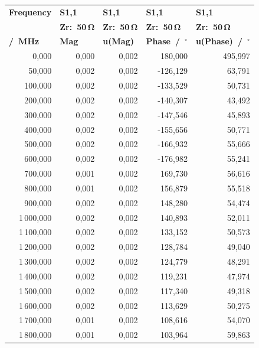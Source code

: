\begin{longtable}{rrrrr}
\multicolumn{1}{l}{\textbf{Frequency}} & \multicolumn{1}{l}{\textbf{S1,1}} & \multicolumn{1}{l}{\textbf{S1,1}} & \multicolumn{1}{l}{\textbf{S1,1}} & \multicolumn{1}{l}{\textbf{S1,1}}\\
\multicolumn{1}{l}{\textbf{}} & \multicolumn{1}{l}{\textbf{Zr:~50\,$\mathbf{\Omega}$}} & \multicolumn{1}{l}{\textbf{Zr:~50\,$\mathbf{\Omega}$}} & \multicolumn{1}{l}{\textbf{Zr:~50\,$\mathbf{\Omega}$}} & \multicolumn{1}{l}{\textbf{Zr:~50\,$\mathbf{\Omega}$}}\\
\multicolumn{1}{l}{\textbf{/~MHz}} & \multicolumn{1}{l}{\textbf{Mag}} & \multicolumn{1}{l}{\textbf{u(Mag)}} & \multicolumn{1}{l}{\textbf{Phase~/~$\mathbf{^{\circ}}$}} & \multicolumn{1}{l}{\textbf{u(Phase)~/~$\mathbf{^{\circ}}$}}\\
\hline
\endhead
0,000 & 0,000 & 0,002 & 180,000 & 495,997\\
50,000 & 0,002 & 0,002 & -126,129 & 63,791\\
100,000 & 0,002 & 0,002 & -133,529 & 50,731\\
200,000 & 0,002 & 0,002 & -140,307 & 43,492\\
300,000 & 0,002 & 0,002 & -147,546 & 45,893\\
400,000 & 0,002 & 0,002 & -155,656 & 50,771\\
500,000 & 0,002 & 0,002 & -166,932 & 55,666\\
600,000 & 0,002 & 0,002 & -176,982 & 55,241\\
700,000 & 0,001 & 0,002 & 169,730 & 56,616\\
800,000 & 0,001 & 0,002 & 156,879 & 55,518\\
900,000 & 0,002 & 0,002 & 148,280 & 54,474\\
1\,000,000 & 0,002 & 0,002 & 140,893 & 52,011\\
1\,100,000 & 0,002 & 0,002 & 133,152 & 50,573\\
1\,200,000 & 0,002 & 0,002 & 128,784 & 49,040\\
1\,300,000 & 0,002 & 0,002 & 124,779 & 48,291\\
1\,400,000 & 0,002 & 0,002 & 119,231 & 47,974\\
1\,500,000 & 0,002 & 0,002 & 117,340 & 49,318\\
1\,600,000 & 0,002 & 0,002 & 113,629 & 50,275\\
1\,700,000 & 0,001 & 0,002 & 108,616 & 54,070\\
1\,800,000 & 0,001 & 0,002 & 103,964 & 59,863\\

\end{longtable}

